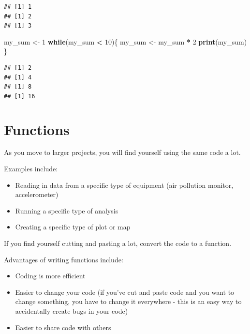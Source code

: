 \documentclass[]{book}
\makeatletter
\newenvironment{Shaded}{\begin{snugshade}}{\end{snugshade}}
\newcommand{\KeywordTok}[1]{\textcolor[rgb]{0.13,0.29,0.53}{\textbf{#1}}}
\newcommand{\DecValTok}[1]{\textcolor[rgb]{0.00,0.00,0.81}{#1}}
\newcommand{\StringTok}[1]{\textcolor[rgb]{0.31,0.60,0.02}{#1}}
\newcommand{\ControlFlowTok}[1]{\textcolor[rgb]{0.13,0.29,0.53}{\textbf{#1}}}
\newcommand{\OperatorTok}[1]{\textcolor[rgb]{0.81,0.36,0.00}{\textbf{#1}}}
\newcommand{\NormalTok}[1]{#1}
\providecommand{\tightlist}{%
  \setlength{\itemsep}{0pt}\setlength{\parskip}{0pt}}
\newenvironment{kframe}{%
\medskip{}
\setlength{\fboxsep}{.8em}
 \def\at@end@of@kframe{}%
 \ifinner\ifhmode%
  \def\at@end@of@kframe{\end{minipage}}%
  \begin{minipage}{\columnwidth}%
 \fi\fi%
 \def\FrameCommand##1{\hskip\@totalleftmargin \hskip-\fboxsep
 \colorbox{shadecolor}{##1}\hskip-\fboxsep
     \hskip-\linewidth \hskip-\@totalleftmargin \hskip\columnwidth}%
 \MakeFramed {\advance\hsize-\width
   \@totalleftmargin\z@ \linewidth\hsize
   \@setminipage}}%
 {\par\unskip\endMakeFramed%
 \at@end@of@kframe}
\renewenvironment{Shaded}{\begin{kframe}}{\end{kframe}}
\theoremstyle{definition}
\theoremstyle{definition}
\theoremstyle{definition}
\theoremstyle{remark}
\makeatother
\begin{document}
\begin{verbatim}
## [1] 1
## [1] 2
## [1] 3
\end{verbatim}

\begin{Shaded}
\begin{Highlighting}[]
\NormalTok{my_sum <-}\StringTok{ }\DecValTok{1}
\ControlFlowTok{while}\NormalTok{(my_sum }\OperatorTok{<}\StringTok{ }\DecValTok{10}\NormalTok{)\{}
\NormalTok{  my_sum <-}\StringTok{ }\NormalTok{my_sum }\OperatorTok{*}\StringTok{ }\DecValTok{2}
  \KeywordTok{print}\NormalTok{(my_sum)}
\NormalTok{\}}
\end{Highlighting}
\end{Shaded}

\begin{verbatim}
## [1] 2
## [1] 4
## [1] 8
## [1] 16
\end{verbatim}

\section{Functions}\label{functions}

As you move to larger projects, you will find yourself using the same
code a lot. \bigskip

Examples include:

\begin{itemize}
\tightlist
\item
  Reading in data from a specific type of equipment (air pollution
  monitor, accelerometer)
\item
  Running a specific type of analysis
\item
  Creating a specific type of plot or map
\end{itemize}

\bigskip 

If you find yourself cutting and pasting a lot, convert the code to a
function.

Advantages of writing functions include:

\begin{itemize}
\tightlist
\item
  Coding is more efficient
\item
  Easier to change your code (if you've cut and paste code and you want
  to change something, you have to change it everywhere - this is an
  easy way to accidentally create bugs in your code)
\item
  Easier to share code with others
\end{itemize}
\end{document}
